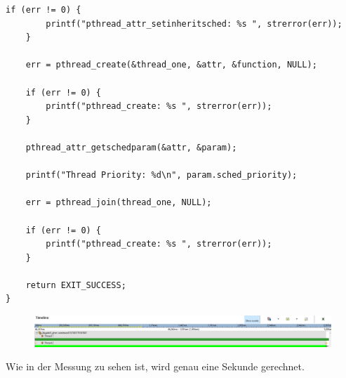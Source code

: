 \documentclass[12pt,a4paper,bibliography=totocnumbered]{scrartcl}
\begin{document}
\begin{lstlisting}[style=CStyle]
	if (err != 0) {
		printf("pthread_attr_setinheritsched: %s ", strerror(err));
	}

	err = pthread_create(&thread_one, &attr, &function, NULL);

	if (err != 0) {
		printf("pthread_create: %s ", strerror(err));
	}

	pthread_attr_getschedparam(&attr, &param);

	printf("Thread Priority: %d\n", param.sched_priority);

	err = pthread_join(thread_one, NULL);

	if (err != 0) {
		printf("pthread_create: %s ", strerror(err));
	}

	return EXIT_SUCCESS;
}
\end{lstlisting}

\newpage
\begin{figure}[h]
\includegraphics[width=\textwidth]{bilder/QNX_Abgabe3_HeavyWork}
\centering
\end{figure}
Wie in der Messung zu sehen ist, wird genau eine Sekunde gerechnet.
\end{document}
